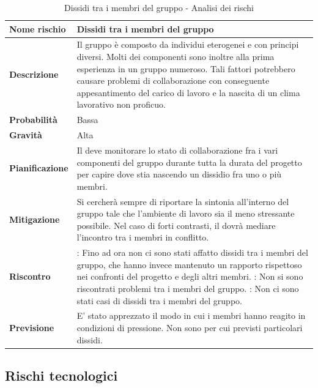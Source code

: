 \documentclass[12pt,a4paper]{article}
\begin{document}
\begin{table}[H]
	\begin{center}
		\begin{tabular}{p{} p{}}
			\toprule
			\textbf{Nome rischio} & \textbf{Dissidi tra i membri del gruppo} \\
			\midrule
			\midrule
			\textbf{Descrizione} & Il gruppo è composto da individui eterogenei e con principi diversi. Molti dei componenti sono inoltre alla prima esperienza in un gruppo numeroso. Tali fattori potrebbero causare problemi di collaborazione con conseguente appesantimento del carico di lavoro e la nascita di un clima lavorativo non proficuo. \\
			\midrule
			\textbf{Probabilità} & Bassa \\
			\midrule
			\textbf{Gravità} & Alta \\
			\midrule
			\textbf{Pianificazione} & Il \PM{} deve monitorare lo stato di collaborazione fra i vari componenti del gruppo durante tutta la durata del progetto per capire dove stia nascendo un dissidio fra uno o più membri. \\
			\midrule
			\textbf{Mitigazione} & Si cercherà sempre di riportare la sintonia all’interno del gruppo tale che l’ambiente di lavoro sia il meno stressante possibile. Nel caso di forti contrasti, il \PM{} dovrà mediare l’incontro tra i membri in conflitto. \\
			\midrule
			\textbf{Riscontro} & 
                \textbf{\FA{}}: Fino ad ora non ci sono stati affatto dissidi tra i membri del gruppo, 
                    che hanno invece mantenuto un rapporto rispettoso nei confronti 
                    del progetto e degli altri membri. \newline
                \textbf{\FAD{}}: Non si sono riscontrati problemi tra i membri del gruppo. \newline
                \textbf{\FPA{}}: Non ci sono stati casi di dissidi tra i membri del gruppo. \\
            \midrule
			\textbf{Previsione} & E' stato apprezzato il modo in cui i membri hanno reagito in condizioni di pressione. Non sono per cui previsti particolari dissidi. \\
			\bottomrule
		\end{tabular}
		\caption{Dissidi tra i membri del gruppo - Analisi dei rischi}
	\end{center}
\end{table}

\subsection{Rischi tecnologici}
\end{document}
